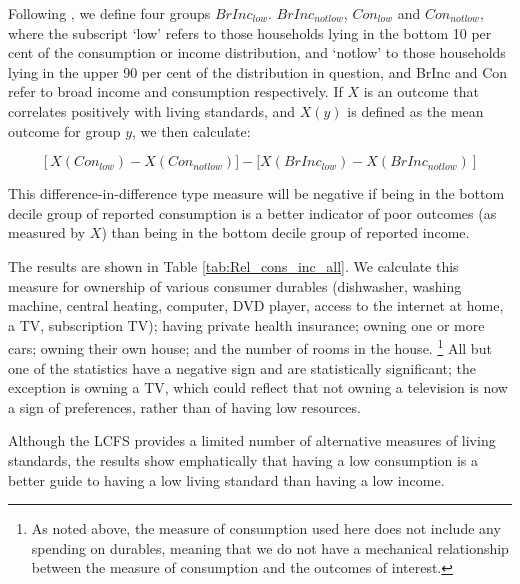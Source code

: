 Following \citet{meyer2003measuring}, we define four groups $BrInc_{low}$. $BrInc_{notlow}$, $Con_{low}$
and $Con_{notlow}$, where the subscript `low' refers to those households
lying in the bottom 10 per cent of the consumption or income distribution,
and `notlow' to those households lying in the upper 90 per cent of
the distribution in question, and BrInc and Con refer to broad income and consumption respectively. If 
$X$ is an outcome that correlates positively
with living standards, and $X(y)$ is defined as the mean outcome for group
$y$, we then calculate:

\begin{equation}
\left[X(Con_{low})-X(Con_{notlow})] - [X(BrInc_{low})-X(BrInc_{notlow})\right]\label{eq:diffindiff}
\end{equation}

This difference-in-difference type measure will be negative if being in the bottom decile group of reported
consumption is a better indicator of poor outcomes (as measured by $X$) than being in the
bottom decile group of reported income.

The results are shown in Table \ref{tab:Rel_cons_inc_all}. We calculate this measure for ownership of various consumer durables
(dishwasher, washing machine, central heating, computer, DVD player,
access to the internet at home, a TV, subscription TV); having private health
insurance; owning one or more cars; owning their own house; and the
number of rooms in the house. \footnote{As noted above, the measure of consumption
used here does not include any spending on durables, meaning that we do not have a mechanical relationship
between the measure of consumption and the outcomes of interest.} All but
one of the statistics have a negative sign and are statistically significant;
the exception is owning a TV, which could reflect that not owning a television is now a sign of preferences, rather than of having low resources. 

Although the LCFS provides
a limited number of alternative measures of living standards, 
the results show emphatically that having a low consumption is
a better guide to having a low living standard than having a low
income.

